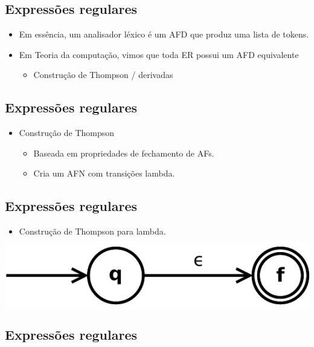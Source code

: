 \documentclass[11pt]{article}
\begin{document}
\subsection*{Expressões regulares}
\label{sec:org4164f77}

\begin{itemize}
\item Em essência, um analisador léxico é um AFD que produz
uma lista de tokens.
\item Em Teoria da computação, vimos que toda ER possui um AFD
equivalente
\begin{itemize}
\item Construção de Thompson / derivadas
\end{itemize}
\end{itemize}
\subsection*{Expressões regulares}
\label{sec:org56cdb2f}

\begin{itemize}
\item Construção de Thompson
\begin{itemize}
\item Baseada em propriedades de fechamento de AFs.
\item Cria um AFN com transições lambda.
\end{itemize}
\end{itemize}
\subsection*{Expressões regulares}
\label{sec:org6f42691}

\begin{itemize}
\item Construção de Thompson para lambda.
\end{itemize}

\begin{center}
\includegraphics[width=.9\linewidth]{./Thompson-epsilon.png}
\end{center}
\subsection*{Expressões regulares}
\label{sec:org7975814}
\end{document}
